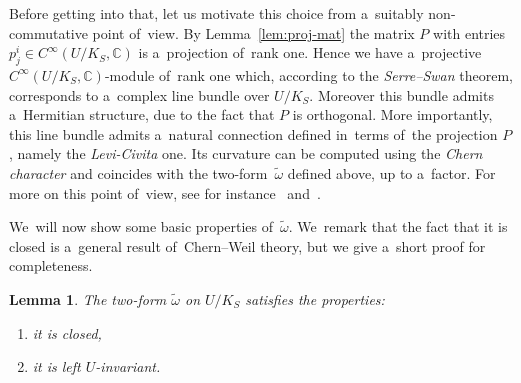 \documentclass[pdftex]{sigma}
\numberwithin{equation}{section}
\newtheorem{Lemma}[Theorem]{Lemma}
\newcommand{\bbC}{\mathbb{C}}
\newcommand{\kafot}{\tilde{\omega}}
\begin{document}
Before getting into that, let us motivate this choice from a~suitably non-commutative point of~view.
By Lemma~\ref{lem:proj-mat} the matrix $P$ with entries $p^i_j \in C^\infty(U / K_S, \bbC)$ is a~projection of~rank one.
Hence we have a~projective $C^\infty(U / K_S, \bbC)$-module of~rank one which, according to the \emph{Serre--Swan} theorem, corresponds to a~complex line bundle over $U / K_S$.
Moreover this bundle admits a~Hermitian structure, due to the fact that $P$ is orthogonal.
More importantly, this line bundle admits a~natural connection defined in~terms of~the projection $P$, namely the \emph{Levi-Civita} one.
Its curvature can be computed using the \emph{Chern character} and coincides with the two-form~$\tilde{\omega}$ defined above, up to a~factor.
For more on this point of~view, see for instance~\cite[Chapter~1]{karoubi} and~\cite[Chapter~8]{loday}.

We~will now show some basic properties of~$\kafot$.
We~remark that the fact that it is closed is a~general result of~Chern--Weil theory, but we give a~short proof for completeness.

\begin{Lemma}
The two-form $\kafot$ on $U / K_S$ satisfies the properties:
\begin{enumerate}\itemsep=0pt
\item[$1)$] it is closed,
\item[$2)$] it is left $U$-invariant.
\end{enumerate}
\end{Lemma}
\end{document}
